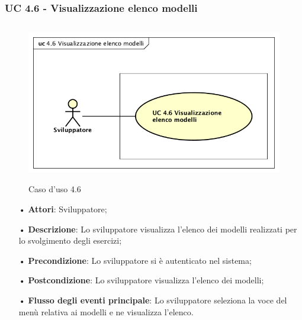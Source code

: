 \subsubsection{UC 4.6 - Visualizzazione elenco modelli}
\begin{figure}[H]
\centering
\includegraphics[width=17cm, height=7cm]{img/UC460.png} 
\caption{Caso d'uso 4.6}\label{fig:460}
\end{figure}
\begin{itemize}
\item[•]\textbf{Attori}: Sviluppatore;
\item[•]\textbf{Descrizione}: Lo sviluppatore visualizza l'elenco dei modelli realizzati per lo svolgimento degli esercizi;
\item[•]\textbf{Precondizione}: Lo sviluppatore si è autenticato nel sistema;
\item[•]\textbf{Postcondizione}: Lo sviluppatore visualizza l'elenco dei modelli;
\item[•]\textbf{Flusso degli eventi principale}:  Lo sviluppatore seleziona la voce del menù relativa ai modelli e ne visualizza l'elenco.
\end{itemize}


